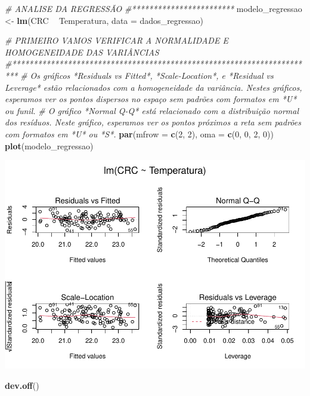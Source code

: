 \documentclass[
]{book}
\newenvironment{Shaded}{\begin{snugshade}}{\end{snugshade}}
\newcommand{\CommentTok}[1]{\textcolor[rgb]{0.56,0.35,0.01}{\textit{#1}}}
\newcommand{\DataTypeTok}[1]{\textcolor[rgb]{0.13,0.29,0.53}{#1}}
\newcommand{\DecValTok}[1]{\textcolor[rgb]{0.00,0.00,0.81}{#1}}
\newcommand{\KeywordTok}[1]{\textcolor[rgb]{0.13,0.29,0.53}{\textbf{#1}}}
\newcommand{\NormalTok}[1]{#1}
\newcommand{\OperatorTok}[1]{\textcolor[rgb]{0.81,0.36,0.00}{\textbf{#1}}}
\newcommand{\StringTok}[1]{\textcolor[rgb]{0.31,0.60,0.02}{#1}}
\begin{document}
\begin{Shaded}
\begin{Highlighting}[]
\CommentTok{# ANALISE DA REGRESSÃO}
\CommentTok{#************************}
\NormalTok{modelo_regressao <-}\StringTok{ }\KeywordTok{lm}\NormalTok{(CRC }\OperatorTok{~}\StringTok{ }\NormalTok{Temperatura, }\DataTypeTok{data =}\NormalTok{ dados_regressao)}

\CommentTok{# PRIMEIRO VAMOS VERIFICAR A NORMALIDADE E HOMOGENEIDADE DAS VARIÂNCIAS}
\CommentTok{#***********************************************************************}
\CommentTok{# Os gráficos *Residuals vs Fitted*, *Scale-Location*, e *Residual vs Leverage* estão relacionados com a homogeneidade da variância. Nestes gráficos, esperamos ver os pontos dispersos no espaço sem padrões com formatos em *U* ou funil. }
\CommentTok{# O gráfico *Normal Q-Q* está relacionado com a distribuição normal dos resíduos. Neste gráfico, esperamos ver os pontos próximos a reta sem padrões com formatos em *U* ou *S*. }
\KeywordTok{par}\NormalTok{(}\DataTypeTok{mfrow =} \KeywordTok{c}\NormalTok{(}\DecValTok{2}\NormalTok{, }\DecValTok{2}\NormalTok{), }\DataTypeTok{oma =} \KeywordTok{c}\NormalTok{(}\DecValTok{0}\NormalTok{, }\DecValTok{0}\NormalTok{, }\DecValTok{2}\NormalTok{, }\DecValTok{0}\NormalTok{))}
\KeywordTok{plot}\NormalTok{(modelo_regressao)}
\end{Highlighting}
\end{Shaded}

\includegraphics{livro_r_ecologia_files/figure-latex/unnamed-chunk-9-1.pdf}

\begin{Shaded}
\begin{Highlighting}[]
\KeywordTok{dev.off}\NormalTok{()}
\end{Highlighting}
\end{Shaded}
\end{document}
